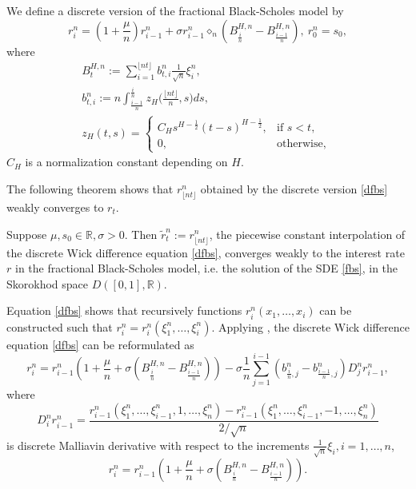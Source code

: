 \documentclass[reqno]{amsart}
\begin{document}
We define a discrete version of the fractional Black-Scholes model by
\begin{equation}
\label{dfbs}
 r_i^n=\left(1+\frac{\mu}{n}\right) r_{i-1}^n+\sigma r_{i-1}^n \diamond_n\left(B_{\frac{i}{n}}^{H, n}-B_{\frac{i-1}{n}}^{H, n}\right), \ r_0^n=s_0,
\end{equation}
where
\begin{gather*}
 B_t^{H, n}:=\sum_{i=1}^{\lfloor n t\rfloor} b_{t, i}^n \frac{1}{\sqrt{n}} \xi_i^n,\\
 b_{t, i}^n:=n \int_{\frac{i-1}{n}}^{\frac{i}{n}} z_H
 \Big(\frac{\lfloor n t\rfloor}{n}, s\Big) d s, \\
 z_H(t,s)
  = \begin{cases}C_H s^{H-\frac{1}{2}}(t-s)^{H-\frac{1}{2}},
   & \text{if } s<t, \\ 
   0, & \text{otherwise, }
   \end{cases}
\end{gather*}
$ C_H$ is a normalization constant depending on $H$.

The following theorem shows that $r_{\lfloor n t\rfloor}^n$ obtained by the 
discrete version \eqref{dfbs} weakly converges to $r_t$.

\begin{lemma}
Suppose $\mu, s_0 \in \mathbb{R}, \sigma>0$. 
Then $\widetilde{r}_t^n:=r_{\lfloor n t\rfloor}^n$, the piecewise constant 
interpolation of the discrete Wick difference equation \eqref{dfbs}, converges weakly
to the interest rate $r$ in the fractional Black-Scholes model, i.e. the solution of 
the SDE \eqref{fbs}, in the Skorokhod space $D([0,1], \mathbb{R})$.
\end{lemma}

Equation \eqref{dfbs} shows that recursively functions 
$r_{i}^n\left(x_1,\dots, x_i\right)$ can be constructed such that
$r_{i}^n=r_{i}^n\left(\xi_1^n,\dots, \xi_i^n\right)$.
Applying \cite[Lemma 1.3]{bender2012connection}, the discrete Wick difference 
equation \eqref{dfbs} can be reformulated as
\begin{equation}
\label{wffbs}
 r_i^n=r_{i-1}^n\left(1+\frac{\mu}{n}+\sigma\left(B_{\frac{i}{n}}^{H, n}
 -B_{\frac{i-1}{n}}^{H, n}\right)\right)-\sigma \frac{1}{n} \sum_{j=1}^{i-1}
 \left(b_{\frac{i}{n}, j}^n-b_{\frac{i-1}{n}, j}^n\right) D_j^n r_{i-1}^n ,
\end{equation}
where
\begin{equation}
 D_i^n r_{i-1}^n=\frac{r_{i-1}^n\left(\xi_1^n, \dots,
 \xi_{i-1}^n, 1, \dots, \xi_n^n\right)-r_{i-1}^n\left(\xi_1^n,
 \dots, \xi_{i-1}^n,-1, \dots, \xi_n^n\right)}{2 / \sqrt{n}}
\end{equation}
is discrete Malliavin derivative with respect to the increments 
$\frac{1}{\sqrt{n}} \xi_i, i=1, \dots, n$,
\[
r_i^n=r_{i-1}^n\left(1+\frac{\mu}{n}+\sigma
\left(B_{\frac{i}{n}}^{H, n}-B_{\frac{i-1}{n}}^{H, n}\right)\right).
\]
\end{document}
